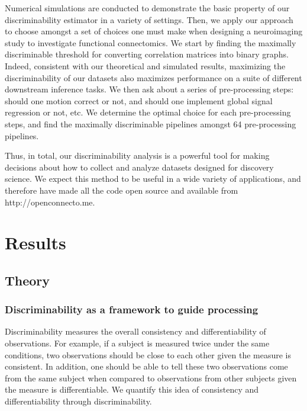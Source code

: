 \documentclass{article}
\begin{document}
 Numerical simulations are conducted to demonstrate the basic property of our discriminability estimator in a variety of settings. Then, we apply our approach to choose amongst a set of choices one must make when designing a neuroimaging study to investigate functional connectomics. We start by finding the maximally discriminable threshold for converting correlation matrices into binary graphs. Indeed, consistent with our theoretical and simulated results, maximizing the discriminability of our datasets also maximizes performance on a suite of different downstream inference tasks. We then ask about a series of pre-processing steps: should one motion correct or not, and should one implement global signal regression or not, etc. We determine the optimal choice for each pre-processing steps, and find the maximally discriminable pipelines amongst 64 pre-processing pipelines.

Thus, in total, our discriminability analysis is a powerful tool for making decisions about how to collect and analyze datasets designed for discovery science. We expect this method to be useful in a wide variety of applications,
and therefore have made all the code open source and available from http://openconnecto.me.




\section{Results}
\subsection{Theory}

\subsubsection{Discriminability as a framework to guide processing}
Discriminability measures the overall consistency and differentiability of observations. For example, if a subject is measured twice under the same conditions, two observations should be close to each other given the measure is consistent. In addition, one should be able to tell these two observations come from the same subject when compared to observations from other subjects given the measure is differentiable. We quantify this idea of consistency and differentiability through discriminability. 
\end{document}
